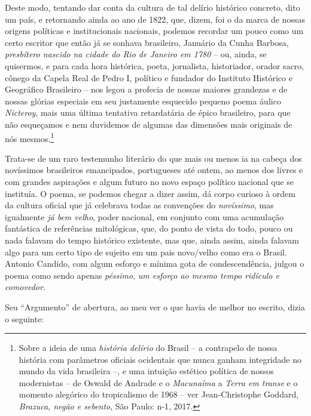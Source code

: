 Deste modo, tentando dar conta da cultura de tal delírio histórico
concreto, dito um país, e retornando ainda ao ano de 1822, que, dizem,
foi o da marca de nossas origens políticas e institucionais nacionais,
podemos recordar um pouco como um certo escritor que então já se sonhava
brasileiro, Januário da Cunha Barbosa, \emph{presbítero nascido na
cidade do Rio de Janeiro em 1780} -- ou, ainda, se quisermos, e para
cada hora histórica, poeta, jornalista, historiador, orador sacro,
cônego da Capela Real de Pedro I, político e fundador do Instituto
Histórico e Geográfico Brasileiro -- nos legou a profecia de nossas
maiores grandezas e de nossas glórias especiais em seu justamente
esquecido pequeno poema áulico \emph{Nicteroy}, mais uma última
tentativa retardatária de épico brasileiro, para que não esqueçamos e
nem duvidemos de algumas das dimensões mais originais de nós
mesmos.\footnote{Sobre a ideia de uma \emph{história delírio} do Brasil
  -- a contrapelo de nossa história com parâmetros oficiais ocidentais
  que nunca ganham integridade no mundo da vida brasileira --, e uma
  intuição estético política de nossos modernistas -- de Oswald de
  Andrade e o \emph{Macunaíma} a \emph{Terra em transe} e o momento
  alegórico do tropicalismo de 1968 -- ver Jean-Christophe Goddard,
  \emph{Brazuca, negão e sebento}, São Paulo: n-1, 2017.}

Trata-se de um raro testemunho literário do que mais ou menos ia na
cabeça dos novíssimos brasileiros emancipados, portugueses até ontem, ao
menos dos livres e com grandes aspirações e algum futuro no novo espaço
político nacional que se instituía. O poema, se podemos chegar a dizer
assim, dá corpo curioso à ordem da cultura oficial que já celebrava
todas as convenções do \emph{novíssimo}, mas igualmente \emph{já bem
velho}, poder nacional, em conjunto com uma acumulação fantástica de
referências mitológicas, que, do ponto de vista do todo, pouco ou nada
falavam do tempo histórico existente, mas que, ainda assim, ainda
falavam algo para um certo tipo de sujeito em um pais novo/velho como
era o Brasil. Antonio Candido, com algum esforço e mínima gota de
condescendência, julgou o poema como sendo apenas \emph{péssimo},
\emph{um esforço ao mesmo tempo ridículo e comovedor}.

Seu ``Argumento'' de abertura, ao meu ver o que havia de melhor no
escrito, dizia o seguinte:

